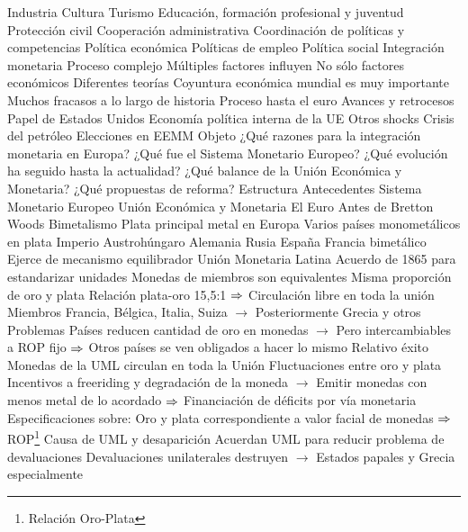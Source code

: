 \documentclass{nuevotema}
\begin{document}
\begin{esquemal}
				\4[] Industria
				\4[] Cultura
				\4[] Turismo
				\4[] Educación, formación profesional y juventud
				\4[] Protección civil
				\4[] Cooperación administrativa
				\4 Coordinación de políticas y competencias
				\4[] Política económica
				\4[] Políticas de empleo
				\4[] Política social
			\3 Integración monetaria
				\4 Proceso complejo
				\4[] Múltiples factores influyen
				\4[] No sólo factores económicos
				\4 Diferentes teorías
				\4 Coyuntura económica mundial es muy importante
				\4 Muchos fracasos a lo largo de historia
			\3 Proceso hasta el euro
				\4 Avances y retrocesos
				\4 Papel de Estados Unidos
				\4 Economía política interna de la UE
				\4 Otros shocks
				\4[] Crisis del petróleo
				\4[] Elecciones en EEMM
		\2 Objeto
			\3 ¿Qué razones para la integración monetaria en Europa?
			\3 ¿Qué fue el Sistema Monetario Europeo?
			\3 ¿Qué evolución ha seguido hasta la actualidad?
			\3 ¿Qué balance de la Unión Económica y Monetaria?
			\3 ¿Qué propuestas de reforma?
		\2 Estructura
			\3 Antecedentes
			\3 Sistema Monetario Europeo
			\3 Unión Económica y Monetaria
			\3 El Euro
	\1 
		\2 Antes de Bretton Woods
			\3 Bimetalismo
				\4 Plata principal metal en Europa
				\4 Varios países monometálicos en plata
				\4[] Imperio Austrohúngaro
				\4[] Alemania
				\4[] Rusia
				\4[] España
				\4 Francia bimetálico
				\4[] Ejerce de mecanismo equilibrador
			\3 Unión Monetaria Latina
				\4 Acuerdo de 1865 para estandarizar unidades
				\4[] Monedas de miembros son equivalentes
				\4[] Misma proporción de oro y plata
				\4[] Relación plata-oro 15,5:1
				\4[] $\then$ Circulación libre en toda la unión
				\4 Miembros
				\4[] Francia, Bélgica, Italia, Suiza
				\4[] $\to$ Posteriormente Grecia y otros
				\4 Problemas
				\4[] Países reducen cantidad de oro en monedas
				\4[] $\to$ Pero intercambiables a ROP fijo
				\4[] $\then$ Otros países se ven obligados a hacer lo mismo
				\4 Relativo éxito
				\4[] Monedas de la UML circulan en toda la Unión
				\4[] Fluctuaciones entre oro y plata
				\4[] Incentivos a freeriding y degradación de la moneda
				\4[] $\to$ Emitir monedas con menos metal de lo acordado
				\4[] $\then$ Financiación de déficits por vía monetaria
				\4 Especificaciones sobre:
				\4[] Oro y plata correspondiente a valor facial de monedas
				\4[] $\then$ ROP\footnote{Relación Oro-Plata}
				\4[$\then$] Causa de UML y desaparición
				\4[] Acuerdan UML para reducir problema de devaluaciones
				\4[] Devaluaciones unilaterales destruyen
				\4[] $\to$ Estados papales y Grecia especialmente

\end{esquemal}
\end{document}
